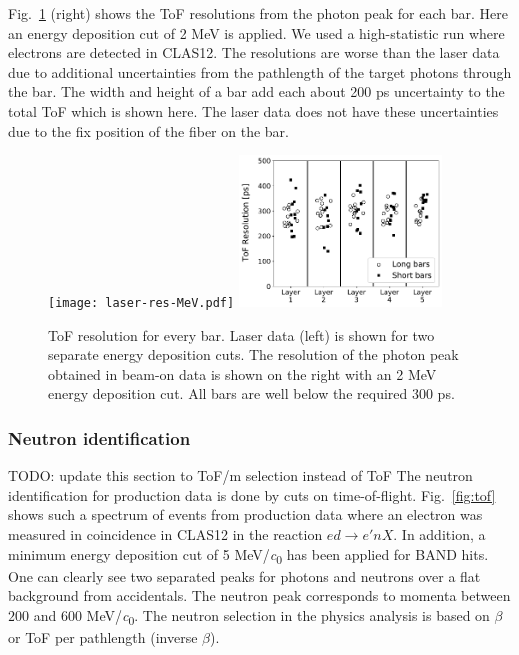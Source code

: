 \documentclass[3p,final,twocolumn]{elsarticle}
\begin{document}
Fig.~\ref{fig:tof_resolution} (right) shows the ToF resolutions from the photon peak for each bar. Here an energy deposition cut of 2 \si{\mega\electronvolt} is applied. We used a high-statistic run where electrons are detected in CLAS12. The resolutions are worse than the laser data due to additional uncertainties from the pathlength of the target photons through the bar. The width and height of a bar add each about 200 \si{\pico\s} uncertainty to the total ToF which is shown here. The laser data does not have these uncertainties due to the fix position of the fiber on the bar.
\begin{figure}[tb]
	\centering
			\texttt{[image: laser-res-MeV.pdf]}
		\includegraphics[width=0.48\textwidth]{tof-resolutions-photons-2MeV.pdf}
	\caption{ToF resolution for every bar. Laser data (left) is shown for two separate energy deposition cuts. The resolution of the photon peak obtained in beam-on data is shown on the right with an 2 \si{\mega\electronvolt} energy deposition cut. All bars are well below the required 300 \si{\pico\s}. }
	\label{fig:tof_resolution}
\end{figure}


\subsubsection{Neutron identification}
\label{sec:neutronidentification}
{\color{red}  TODO: update this section to ToF/m selection instead of ToF}
The neutron identification for production data is done by cuts on time-of-flight. Fig.~\ref{fig:tof} shows such a spectrum of events from production data where an electron was measured in coincidence in CLAS12 in the reaction $ed \rightarrow e'nX$. In addition, a minimum energy deposition cut of 5 \si{\MeV/\clight} has been applied for BAND hits. One can clearly see two separated peaks for photons and neutrons over a flat background from accidentals. The neutron peak corresponds to momenta between $200$ and $600$ \si{\MeV/\clight}.
The neutron selection in the physics analysis is based on $\beta$ or ToF per pathlength (inverse $\beta$).
\end{document}
